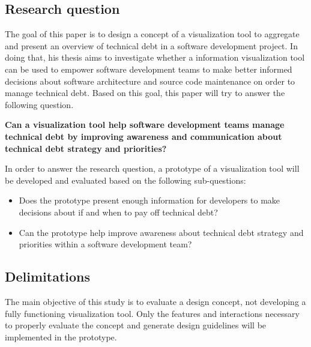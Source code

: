 \subsection{Research question}

The goal of this paper is to design a concept of a visualization tool to aggregate and present an overview of technical debt in a software development project.
In doing that, his thesis aims to investigate whether a information visualization tool can be used to empower software development teams to make better informed decisions about software architecture and source code maintenance on order to manage technical debt.
Based on this goal, this paper will try to answer the following question.

\smallskip
\textbf{
Can a visualization tool help software development teams manage technical debt by improving awareness and communication about technical debt strategy and priorities?
}
\smallskip

In order to answer the research question, a prototype of a visualization tool will be developed and evaluated based on the following sub-questions:
\begin{itemize}
\item Does the prototype present enough information for developers to make decisions about if and when to pay off technical debt?
\item Can the prototype help improve awareness about technical debt strategy and priorities within a software development team?
\end{itemize}

\subsection{Delimitations}
The main objective of this study is to evaluate a design concept, not developing a fully functioning visualization tool.
Only the features and interactions necessary to properly evaluate the concept and generate design guidelines will be implemented in the prototype.